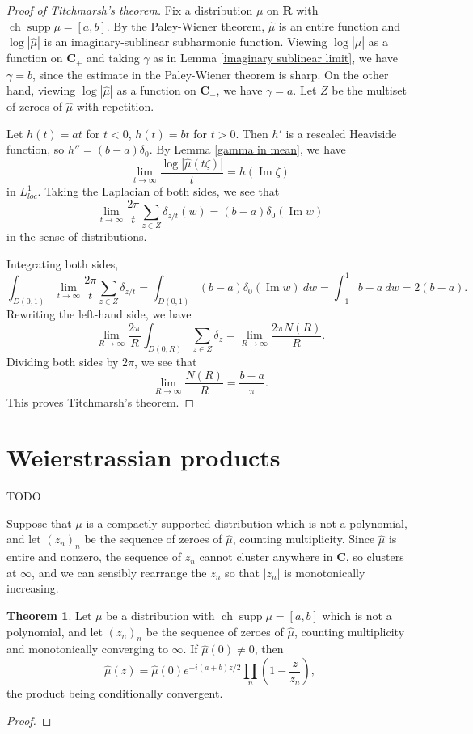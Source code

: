 \documentclass[12pt]{report}
\newcommand{\RR}{\mathbf{R}}
\newcommand{\CC}{\mathbf{C}}
\DeclareMathOperator{\ch}{ch}
\DeclareMathOperator{\supp}{supp}
\renewcommand{\Im}{\operatorname{Im}}
\theoremstyle{definition}
\newtheorem{theorem}{Theorem}[chapter]
\begin{document}
\begin{proof}[Proof of Titchmarsh's theorem]
Fix a distribution $\mu$ on $\RR$ with $\ch \supp \mu = [a, b]$. By the Paley-Wiener theorem, $\hat \mu$ is an entire function and $\log |\hat \mu|$ is an imaginary-sublinear subharmonic function. Viewing $\log |\hat \mu|$ as a function on $\CC_+$ and taking $\gamma$ as in Lemma \ref{imaginary sublinear limit}, we have $\gamma = b$, since the estimate in the Paley-Wiener theorem is sharp. On the other hand, viewing $\log |\hat \mu|$ as a function on $\CC_-$, we have $\gamma = a$. Let $Z$ be the multiset of zeroes of $\hat \mu$ with repetition.

Let $h(t) = at$ for $t < 0$, $h(t) = bt$ for $t > 0$. Then $h'$ is a rescaled Heaviside function, so $h'' = (b-a)\delta_0$. By Lemma \ref{gamma in mean}, we have
$$\lim_{t \to \infty} \frac{\log |\hat \mu(t\zeta)|}{t} = h(\Im \zeta)$$
in $L^1_{loc}$. Taking the Laplacian of both sides, we see that
$$\lim_{t \to \infty} \frac{2\pi}{t} \sum_{z \in Z} \delta_{z/t}(w) = (b-a)\delta_0(\Im w)$$
in the sense of distributions.

Integrating both sides,
$$\int_{D(0, 1)} \lim_{t \to \infty} \frac{2\pi}{t} \sum_{z \in Z} \delta_{z/t} = \int_{D(0, 1)} (b-a)\delta_0(\Im w) ~dw = \int_{-1}^1 b - a ~dw = 2(b - a).$$
Rewriting the left-hand side, we have
$$\lim_{R \to \infty} \frac{2\pi }{R} \int_{D(0, R)} \sum_{z \in Z} \delta_z = \lim_{R \to \infty} \frac{2\pi N(R)}{R}.$$
Dividing both sides by $2\pi$, we see that
$$\lim_{R \to \infty} \frac{N(R)}{R} = \frac{b - a}{\pi}.$$
This proves Titchmarsh's theorem.
\end{proof}

\section{Weierstrassian products}
TODO

Suppose that $\mu$ is a compactly supported distribution which is not a polynomial, and let $(z_n)_n$ be the sequence of zeroes of $\hat \mu$, counting multiplicity. Since $\hat \mu$ is entire and nonzero, the sequence of $z_n$ cannot cluster anywhere in $\CC$, so clusters at $\infty$, and we can sensibly rearrange the $z_n$ so that $|z_n|$ is monotonically increasing.
\begin{theorem}
Let $\mu$ be a distribution with $\ch \supp \mu = [a, b]$ which is not a polynomial, and let $(z_n)_n$ be the sequence of zeroes of $\hat \mu$, counting multiplicity and monotonically converging to $\infty$. If $\hat \mu(0) \neq 0$, then
$$\hat \mu(z) = \hat \mu(0) e^{-i(a+b)z/2}\prod_n \left(1 - \frac{z}{z_n}\right),$$
the product being conditionally convergent.
\end{theorem}
\begin{proof}

\end{proof}
\end{document}
